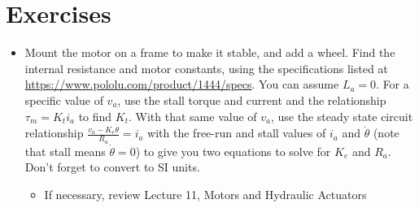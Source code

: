 \section{Exercises}
\begin{itemize}
\item Mount the motor on a frame to make it stable, and add a wheel. Find the internal resistance and motor constants, using the specifications listed at \url{https://www.pololu.com/product/1444/specs}. 
You can assume $L_{a}=0$. For a specific value of $v_{a}$, use the stall torque and current and the relationship $\tau_{m}=K_{t}i_{a}$ to find $K_{t}$. With that same value of $v_{a}$, use the steady state circuit relationship $\frac{v_{a} - K_{e}\dot{\theta}}{R_{a}} = i_{a}$ with the free-run and stall values of $i_{a}$ and $\dot{\theta}$ (note that stall means $\dot{\theta}=0$) to give you two equations to solve for $K_{e}$ and $R_{a}$. Don't forget to convert to SI units. 
\begin{itemize}
\item If necessary, review Lecture 11, Motors and Hydraulic Actuators
\end{itemize}


\end{itemize}
